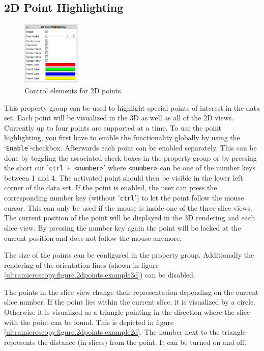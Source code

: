 \subsection{2D Point Highlighting}\label{ultramicroscopy.section.2dpoints}
\begin{minipage}{\textwidth}
\begin{figure}
\vspace*{-0cm}
\centering
\includegraphics[width=0.25\textwidth]{images/2d_points.png}
\caption{Control elements for 2D points.}
\label{ultramicroscopy.figure.2dpoints}
\end{figure}
This property group can be used to highlight special points of interest in the data set. Each point will be visualized in the 3D as well as all of the 2D views. 
Currently up to four points are supported at a time. To use the point highlighting, you first have to enable the functionality globally by 
using the `\verb|Enable|'-checkbox.
Afterwards each point can be enabled separately. This can be done by toggling the associated check boxes in the property group or by pressing the short cut '\verb|ctrl + <number>|' where \verb|<number>| can be one of the number keys between 1 and 4. 
The activated point should then be visible in the lower left corner of the data set. If the point is enabled, the user can press the corresponding number key (without '\verb|ctrl|') to let the point follow the mouse cursor. 
This can only be used if the mouse is inside one of the three slice views. 
The current position of the point will be displayed in the 3D rendering and each slice view. 
By pressing the number key again the point will be locked at the current position and does not follow the mouse anymore.

The size of the points can be configured in the property group. 
Additionally the rendering of the orientation lines (shown in figure \ref{ultramicroscopy.figure.2dpoints.example3d}) can be disabled.

The points in the slice view change their representation depending on the current slice number. 
If the point lies within the current slice, it is visualized by a circle. 
Otherwise it is visualized as a triangle pointing in the direction where the slice with the point can be found.
This is depicted in figure \ref{ultramicroscopy.figure.2dpoints.example2d}. 
The number next to the triangle represents the distance (in slices) from the point. It can be turned on and off.
\end{minipage}
